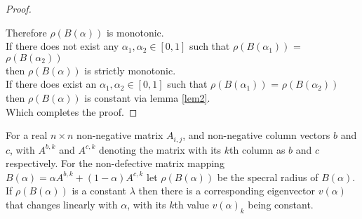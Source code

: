 \begin{proof}
\begin{itemize}[leftmargin=*,labelsep=4mm]
\end{itemize}
Therefore $\rho(B(\alpha))$ is monotonic.\\
If there does not exist any $\alpha_1,\alpha_2\in[0,1]$ such that $\rho(B(\alpha_1))$ = $\rho(B(\alpha_2))$\\
\-\hspace{8mm}then $\rho(B(\alpha))$ is strictly monotonic.\\
If there does exist an $\alpha_1,\alpha_2\in[0,1]$ such that $\rho(B(\alpha_1))$ = $\rho(B(\alpha_2))$\\
\-\hspace{8mm}then $\rho(B(\alpha))$ is constant via lemma \ref{lem2}.\\
Which completes the proof.
\end{proof}


\begin{Theorem}\label{th:3}
For a real $n\times n$ non-negative matrix $A_{i,j}$, and non-negative column vectors $b$ and $c$, with $A^{b,k}$ and $A^{c,k}$ denoting the matrix with its $k$th column as $b$ and $c$ respectively. For the non-defective matrix mapping $B(\alpha) = \alpha A^{b,k} + (1-\alpha)A^{c,k}$ let $\rho(B(\alpha))$ be the specral radius of $B(\alpha)$.
If $\rho(B(\alpha))$ is a constant $\lambda$ then there is a corresponding eigenvector $v(\alpha)$ that changes linearly with $\alpha$, with its $k$th value $v(\alpha)_k$ being constant.
\end{Theorem}

